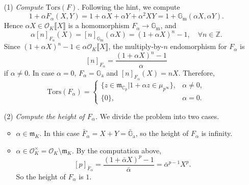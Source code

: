 \documentclass{article}
\theoremstyle{definition}
\theoremstyle{remark}
\newcommand{\C}{\mathbb{C}}
\newcommand{\Z}{\mathbb{Z}}
\renewcommand{\O}{\mathcal{O}}
\newcommand{\m}{\mathfrak{m}}
\newcommand{\Gm}{\mathbb{G}_{\mathrm{m}}}
\newcommand{\Ga}{\mathbb{G}_{\mathrm{a}}}
\begin{document}
\subsection{}
\begin{enumerate}
\item [(1)] \textit{Compute $\mathrm{Tors}(F)$}.
Following the hint, we compute
\[1+\alpha F_\alpha(X, Y) = 1 + \alpha X + \alpha Y + \alpha^2XY = 1 + \mathbb{G}_{\mathrm{m}}(\alpha X, \alpha Y).\]
Hence $\alpha X\in \O_K\llbracket X\rrbracket$ is a homomorphism $F_\alpha\to\Gm$, and \[\alpha[n]_{F_\alpha}(X) = [n]_{\Gm}(\alpha X) = (1 + \alpha X)^n - 1,\quad\forall n\in\Z.\]
Since $(1 + \alpha X)^n - 1 \in \alpha\O_K\llbracket X\rrbracket$, the multiply-by-$n$ endomorphism for $F_\alpha$ is \[[n]_{F_\alpha} = \frac{(1 + \alpha X)^n - 1}{\alpha}\] if $\alpha\ne 0$. In case $\alpha = 0$, $F_\alpha = \Ga$ and $[n]_{F_\alpha}(X) = nX$.
Therefore, \[\mathrm{Tors}(F_\alpha) = \begin{cases}
    \{z\in\m_{\C_p} | 1 + \alpha z\in\mu_{p^{\infty}}\}, &\alpha\ne 0,\\
    \{0\}, &\alpha = 0.
\end{cases}\]
\item [(2)] \textit{Compute the height of $F_\alpha$.}
We divide the problem into two cases.
\begin{itemize}
    \item $\alpha\in \m_K$.
    In this case $\bar{F}_\alpha = X + Y  = \bar{\mathbb{G}}_\mathrm{a}$, so the height of $F_\alpha$ is infinity.
    \item $\alpha\in\O_K^\times = \O_K\setminus \m_K$.
    By the computation above, \[[p]_{\bar{F}_\alpha} = \frac{(1 + \bar{\alpha} X)^p - 1}{\bar{\alpha}} = \bar{\alpha}^{p-1} X^p.\]
    So the height of $F_\alpha$ is $1$.
\end{itemize} 

\end{enumerate}
\end{document}
